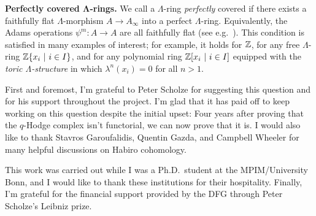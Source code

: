 \documentclass[DIV=12,numbers=enddot,leqno,bibliography=totoc]{scrartcl}
\begin{document}
\begin{numpar}
\begin{alphanumerate}
			\item \textbf{Perfectly covered $\boldsymbol\Lambda$-rings.} We call a $\Lambda$-ring \emph{perfectly} covered if there exists a faithfully flat $\Lambda$-morphism $A\rightarrow A_\infty$ into a perfect $\Lambda$-ring. Equivalently, the Adams operations $\psi^m\colon A\rightarrow A$ are all faithfully flat (see e.g.\ \cite[Remark~]{qWitt}). This condition is satisfied in many examples of interest; for example, it holds for $\mathbb{Z}$, for any free $\Lambda$-ring $\IZ\left\{x_i\ \middle|\ i\in I\right\}$, and for any polynomial ring $\IZ\left[x_i\ \middle|\ i\in I\right]$ equipped with the \emph{toric $\Lambda$-structure} in which $\lambda^n(x_i)=0$ for all $n>1$.
		\end{alphanumerate}
	\end{numpar}
	
	\begin{numpar}[Acknowledgements.]
		First and foremost, I'm grateful to Peter Scholze for suggesting this question and for his support throughout the project. I'm glad that it has paid off to keep working on this question despite the initial upset: Four years after proving that the $q$-Hodge complex isn't functorial, we can now prove that it is. I would also like to thank Stavros Garoufalidis, Quentin Gazda, and Campbell Wheeler for many helpful discussions on Habiro cohomology.
		
		This work was carried out while I was a Ph.D.\ student at the MPIM/University Bonn, and I would like to thank these institutions for their hospitality. Finally, I'm grateful for the financial support provided by the DFG through Peter Scholze's Leibniz prize.
	\end{numpar}
	
\end{document}

